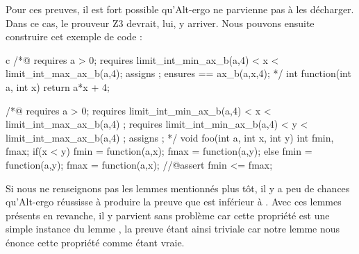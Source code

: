 Pour ces preuves, il est fort possible qu'Alt-ergo ne parvienne pas à les 
décharger. Dans ce cas, le prouveur Z3 devrait, lui, y arriver. Nous pouvons 
ensuite construire cet exemple de code :



\begin{CodeBlock}{c}
/*@
  requires a > 0;
  requires limit_int_min_ax_b(a,4) < x < limit_int_max_ax_b(a,4);
  assigns \nothing ;
  ensures \result == ax_b(a,x,4);
*/
int function(int a, int x){
  return a*x + 4;
}

/*@ 
  requires a > 0;
  requires limit_int_min_ax_b(a,4) < x < limit_int_max_ax_b(a,4) ;
  requires limit_int_min_ax_b(a,4) < y < limit_int_max_ax_b(a,4) ;
  assigns \nothing ;
*/
void foo(int a, int x, int y){
  int fmin, fmax;
  if(x < y){
    fmin = function(a,x);
    fmax = function(a,y);
  } else {
    fmin = function(a,y);
    fmax = function(a,x);
  }
  //@assert fmin <= fmax;
}
\end{CodeBlock}



Si nous ne renseignons pas les lemmes mentionnés plus tôt, il y a peu de chances 
qu'Alt-ergo réussisse à produire la preuve que  est inférieur à .
Avec ces lemmes présents en revanche, il y parvient sans problème car cette 
propriété est une simple instance du lemme , la preuve 
étant ainsi triviale car notre lemme nous énonce cette propriété comme étant vraie.
